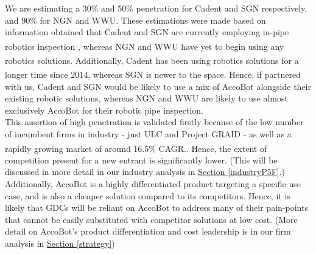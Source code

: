 \documentclass[11pt]{article}		%
\newcommand{\supercite}[1]{\textsuperscript{\cite{#1}}}		%
\newcommand{\sectref}[1]{\hyperref[#1]{Section \ref*{#1}}}     %
\begin{document}
    \hspace*{3ex} We are estimating a 30\% and 50\% penetration for Cadent and SGN respectively, and 90\% for NGN and WWU. These estimations were made based on information obtained that Cadent and SGN are currently employing in-pipe robotics inspection \supercite{cadentbot}\supercite{SGNbot}, whereas NGN and WWU have yet to begin using any robotics solutions\supercite{NGNbot}\supercite{WWUbot}. Additionally, Cadent has been using robotics solutions for a longer time since 2014\supercite{cadentbot}, whereas SGN is newer to the space\supercite{SGNbot}. Hence, if partnered with us, Cadent and SGN would be likely to use a mix of AccoBot alongside their existing robotic solutions, whereas NGN and WWU are likely to use almost exclusively AccoBot for their robotic pipe inspection.
    \\
    \hspace*{3ex}This assertion of high penetration is validated firstly because of the low number of incumbent firms in industry - just ULC and Project GRAID - as well as a rapidly growing market of around 16.5\% CAGR.\supercite{inpipemkt}. Hence, the extent of competition present for a new entrant is significantly lower. (This will be discussed in more detail in our industry analysis in \sectref{industryP5F}.) 
    \\
    \hspace*{3ex}Additionally, AccoBot is a highly differentiated product targeting a specific use case, and is also a cheaper solution compared to its competitors. Hence, it is likely that GDCs will be reliant on AccoBot to address many of their pain-points that cannot be easily substituted with competitor solutions at low cost. (More detail on AccoBot's product differentiation and cost leadership is in our firm analysis in \sectref{strategy})
    
\end{document}
